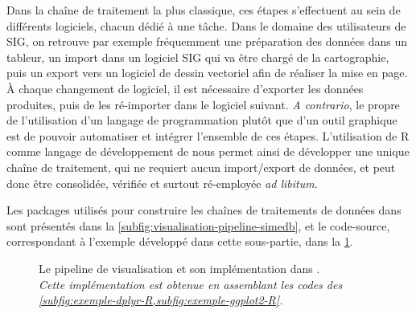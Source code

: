 Dans la chaîne de traitement la plus classique, ces étapes s'effectuent au sein de différents logiciels, chacun dédié à une tâche. Dans le domaine des utilisateurs de SIG, on retrouve par exemple fréquemment une préparation des données dans un tableur, un import dans un logiciel SIG qui va être chargé de la cartographie, puis un export vers un logiciel de dessin vectoriel afin de réaliser la mise en page.
À chaque changement de logiciel, il est nécessaire d'exporter les données produites, puis de les ré-importer dans le logiciel suivant.
\textit{A contrario}, le propre de l'utilisation d'un langage de programmation plutôt que d'un outil graphique est de pouvoir automatiser et intégrer l'ensemble de ces étapes.
L'utilisation de \textsf{R} comme langage de développement de \simedb{} nous permet ainsi de développer une unique chaîne de traitement, qui ne requiert aucun import/export de données, et peut donc être consolidée, vérifiée et surtout ré-employée \textit{ad libitum}.

Les packages utilisés pour construire les chaînes de traitements de données dans \simedb{} sont présentés dans la \cref{subfig:visualisation-pipeline-simedb}, et le code-source, correspondant à l'exemple développé dans cette sous-partie, dans la \cref{fig:visualisation-pipeline-exemple}.

\begin{figure}[H]
	\centering
	\hspace{5pt}
	\caption[Le \og pipeline\fg{} de visualisation et son implémentation dans \simedb{}.]{Le \og pipeline\fg{} de visualisation et son implémentation dans \simedb{}.\\
	\textit{Cette implémentation est obtenue en assemblant les codes des \cref{subfig:exemple-dplyr-R,subfig:exemple-ggplot2-R}.}}
	\label{fig:visualisation-pipeline-exemple}
\end{figure}

